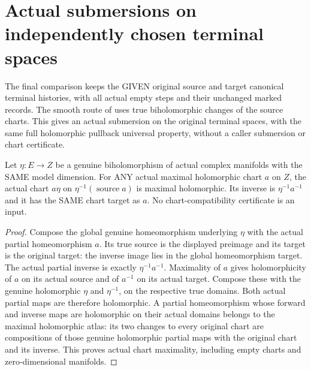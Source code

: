 \section{Actual submersions on independently chosen terminal spaces}

The final comparison keeps the GIVEN original source and target canonical
terminal histories, with all actual empty steps and their unchanged marked
records. The smooth route of \cite{bierstone-milman08-functoriality} uses
true biholomorphic changes of the source charts. This gives an actual
submersion on the original terminal spaces, with the same full holomorphic
pullback universal property, without a caller submersion or chart certificate.

\begin{lemma}
\label{hir:smooth-terminal-biholomorphic-maximal-chart-pullback}
\leanok
{}
Let $\eta:E\to Z$ be a genuine biholomorphism of actual complex manifolds
with the SAME model dimension. For ANY actual maximal holomorphic chart
$a$ on $Z$, the actual chart $a\eta$ on $\eta^{-1}(\operatorname{source}a)$
is maximal holomorphic. Its inverse is $\eta^{-1}a^{-1}$ and it has the
SAME chart target as $a$. No chart-compatibility certificate is an input.
\end{lemma}
\begin{proof}
Compose the global genuine homeomorphism underlying $\eta$ with the actual
partial homeomorphism $a$. Its true source is the displayed preimage and
its target is the original target: the inverse image lies in the global
homeomorphism target. The actual partial inverse is exactly
$\eta^{-1}a^{-1}$. Maximality of $a$ gives holomorphicity of $a$ on its
actual source and of $a^{-1}$ on its actual target. Compose these with
the genuine holomorphic $\eta$ and $\eta^{-1}$, on the respective true
domains. Both actual partial maps are therefore holomorphic. A partial
homeomorphism whose forward and inverse maps are holomorphic on their
actual domains belongs to the maximal holomorphic atlas: its two changes
to every original chart are compositions of those genuine holomorphic
partial maps with the original chart and its inverse. This proves actual
chart maximality, including empty charts and zero-dimensional manifolds.
\end{proof}

